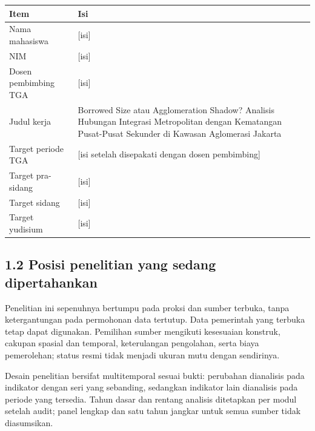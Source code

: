 \documentclass[
  indonesian,
  11pt,
]{article}
\newcounter{none} %
\begin{document}
{\def\LTcaptype{none} %
\begin{longtable}[]{@{}
  >{\raggedright\arraybackslash}p{}
  >{\raggedright\arraybackslash}p{}@{}}
\toprule\noalign{}
\begin{minipage}[b]{\linewidth}\raggedright
Item
\end{minipage} & \begin{minipage}[b]{\linewidth}\raggedright
Isi
\end{minipage} \\
\midrule\noalign{}
\endhead
\bottomrule\noalign{}
\endlastfoot
Nama mahasiswa & {[}isi{]} \\
NIM & {[}isi{]} \\
Dosen pembimbing TGA & {[}isi{]} \\
Judul kerja & Borrowed Size atau Agglomeration Shadow? Analisis Hubungan
Integrasi Metropolitan dengan Kematangan Pusat-Pusat Sekunder di Kawasan
Aglomerasi Jakarta \\
Target periode TGA & {[}isi setelah disepakati dengan dosen
pembimbing{]} \\
Target pra-sidang & {[}isi{]} \\
Target sidang & {[}isi{]} \\
Target yudisium & {[}isi{]} \\
\end{longtable}
}

\subsection{1.2 Posisi penelitian yang sedang
dipertahankan}\label{posisi-penelitian-yang-sedang-dipertahankan}

Penelitian ini sepenuhnya bertumpu pada proksi dan sumber terbuka, tanpa
ketergantungan pada permohonan data tertutup. Data pemerintah yang
terbuka tetap dapat digunakan. Pemilihan sumber mengikuti kesesuaian
konstruk, cakupan spasial dan temporal, keterulangan pengolahan, serta
biaya pemerolehan; status resmi tidak menjadi ukuran mutu dengan
sendirinya.

Desain penelitian bersifat multitemporal sesuai bukti: perubahan
dianalisis pada indikator dengan seri yang sebanding, sedangkan
indikator lain dianalisis pada periode yang tersedia. Tahun dasar dan
rentang analisis ditetapkan per modul setelah audit; panel lengkap dan
satu tahun jangkar untuk semua sumber tidak diasumsikan.
\end{document}
